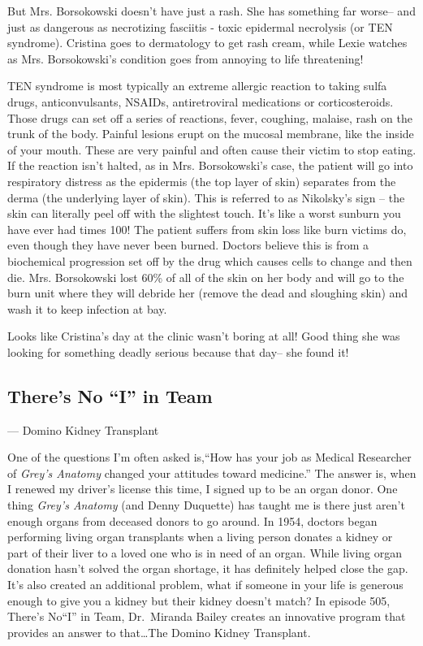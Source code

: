 \documentclass[12pt,a4paper,onecolumn]{article}
\begin{document}
But Mrs. Borsokowski doesn't have just a rash. She has something far worse-- and just as dangerous
as necrotizing fasciitis - toxic\cite{toxic} epidermal\cite{epidermal} necrolysis\cite{necrolysis}
(or TEN syndrome). Cristina goes to dermatology\cite{dermatology} to get rash cream, while Lexie
watches as Mrs. Borsokowski's condition goes from annoying to life threatening!

TEN syndrome is most typically an extreme allergic reaction to taking sulfa\cite{sulfa} drugs,
anticonvulsants\cite{convulsant}, NSAIDs, antiretroviral\cite{retrovirus} medications or
corticosteroids. Those drugs can set off a series of reactions, fever, coughing,
malaise\cite{malaise}, rash\cite{rash} on the trunk of the body. Painful lesions\cite{lesions} erupt
on the mucosal membrane\cite{membrane}, like the inside of your mouth. These are very painful and
often cause their victim to stop eating. If the reaction isn't halted, as in Mrs. Borsokowski's
case, the patient will go into respiratory\cite{respiratory} distress as the
epidermis\cite{epidermis} (the top layer of skin) separates from the derma\cite{derma} (the
underlying layer of skin). This is referred to as Nikolsky's sign -- the skin can literally peel off
with the slightest touch. It's like a worst sunburn you have ever had times 100! The patient suffers
from skin loss like burn victims do, even though they have never been burned. Doctors believe this
is from a biochemical progression set off by the drug which causes cells to change and then die.
Mrs. Borsokowski lost 60\% of all of the skin on her body and will go to the burn unit where they
will debride\cite{debride} her (remove the dead and sloughing skin) and wash it to keep infection at
bay.

Looks like Cristina's day at the clinic wasn't boring at all! Good thing she was looking for
something deadly serious because that day-- she found it!

\subsection{There's No ``I'' in Team}

\begin{flushright} --- Domino Kidney Transplant
\end{flushright}

One of the questions I'm often asked is,``How has your job as Medical Researcher of \emph{Grey's
Anatomy} changed your attitudes toward medicine.'' The answer is, when I renewed my driver's license
this time, I signed up to be an organ donor. One thing \emph{Grey's Anatomy} (and Denny Duquette)
has taught me is there just aren't enough organs from deceased donors to go around. In 1954, doctors
began performing living organ transplants when a living person donates a kidney or part of their
liver to a loved one who is in need of an organ. While living organ donation hasn't solved the organ
shortage, it has definitely helped close the gap. It's also created an additional problem, what if
someone in your life is generous enough to give you a kidney but their kidney doesn't match? In
episode 505, There's No``I'' in Team, Dr.~Miranda Bailey creates an innovative program that provides
an answer to that\ldots The Domino Kidney Transplant.
\end{document}
